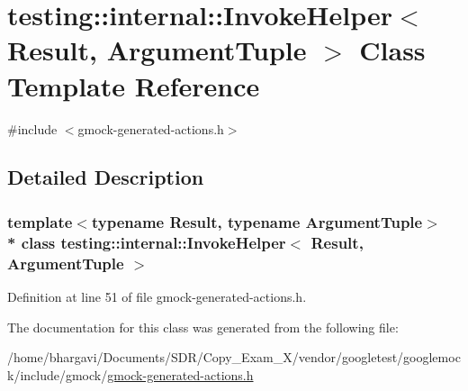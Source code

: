 \hypertarget{classtesting_1_1internal_1_1_invoke_helper}{}\section{testing\+:\+:internal\+:\+:Invoke\+Helper$<$ Result, Argument\+Tuple $>$ Class Template Reference}
\label{classtesting_1_1internal_1_1_invoke_helper}


{\ttfamily \#include $<$gmock-\/generated-\/actions.\+h$>$}



\subsection{Detailed Description}
\subsubsection*{template$<$typename Result, typename Argument\+Tuple$>$\\*
class testing\+::internal\+::\+Invoke\+Helper$<$ Result, Argument\+Tuple $>$}



Definition at line 51 of file gmock-\/generated-\/actions.\+h.



The documentation for this class was generated from the following file\+:\begin{DoxyCompactItemize}
\item 
/home/bhargavi/\+Documents/\+S\+D\+R/\+Copy\+\_\+\+Exam\+\_\+X/vendor/googletest/googlemock/include/gmock/\hyperlink{gmock-generated-actions_8h}{gmock-\/generated-\/actions.\+h}\end{DoxyCompactItemize}
